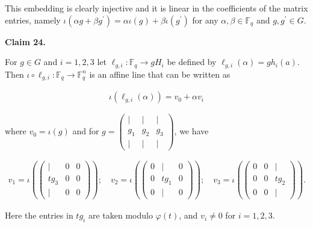 This embedding is clearly injective and it is linear in the coefficients of the matrix entries, namely $\iota(\alpha g+\beta g^{\prime})=\alpha\iota(g)+\beta\iota(g^{\prime})$ for any $\alpha,\beta\in\mathbb{F}_{q}$ and $g,g^{\prime}\in G$.\par





\par\medskip\noindent\textbf{
Claim 24. 
}\par



For $g\in G$ and $i=1,2,3$ let $\ell_{g,i}:\mathbb{F}_{q}\to gH_{i}$ be defined by $\ell_{g,i}(\alpha)=gh_{i}(a)$. Then $\iota\circ\ell_{g,i}:\mathbb{F}_{q}\to\mathbb{F}_{q}^{n}$ is an affine line that can be written as\par


\[\begin{gathered}
\iota(\ell_{g,i}(\alpha))=v_{0}+\alpha v_{i}
\end{gathered}\]


where $v_{0}=\iota(g)$ and for $g=\begin{pmatrix}|&|&|\\
g_{1}&g_{2}&g_{3}\\
|&|&|\end{pmatrix}$, we have\par


\[\begin{gathered}
v_{1}=\iota\left(\begin{pmatrix}|&0&0\\
tg_{3}&0&0\\
|&0&0\end{pmatrix}\right);\quad v_{2}=\iota\left(\begin{pmatrix}0&|&0\\
0&tg_{1}&0\\
0&|&0\end{pmatrix}\right);\quad v_{3}=\iota\left(\begin{pmatrix}0&0&|\\
0&0&tg_{2}\\
0&0&|\end{pmatrix}\right).
\end{gathered}\]


Here the entries in $tg_{i}$ are taken modulo $\varphi(t)$, and $v_{i}\neq 0$ for $i=1,2,3$.\par




